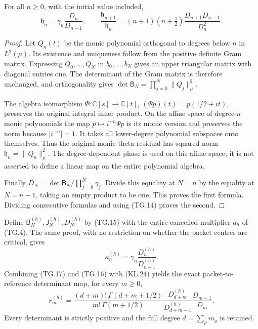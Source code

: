 \begin{theorem}
For all \(n\geq0\), with the initial value included,
\[
 \boxed{\mathfrak h_n=\gamma_n\frac{D_n}{D_{n-1}},\qquad
 \frac{\mathfrak h_{n+1}}{\mathfrak h_n}
   =(n+1)(n+\tfrac12)\frac{D_{n+1}D_{n-1}}{D_n^2}.}
                                                               \tag{TG.16}
\]
\end{theorem}
\begin{proof}
Let \(Q_n(t)\) be the monic polynomial orthogonal to degrees below
\(n\) in \(L^2(\mu)\).  Its existence and uniqueness follow
from the positive definite Gram matrix.  Expressing
\(Q_0,\ldots,Q_N\) in \(b_0,\ldots,b_N\) gives an upper
triangular matrix with diagonal entries one.  The determinant of
the Gram matrix is therefore unchanged, and orthogonality gives
\(\det\mathsf B_N=\prod_{j=0}^N\|Q_j\|_\mu^2\).

The algebra isomorphism
\(\Psi:\mathbb C[s]\to\mathbb C[t]\),
\((\Psi p)(t)=p(1/2+it)\), preserves the original integral
inner product.  On the affine space of degree-\(n\) monic
polynomials the map \(p\mapsto i^{-n}\Psi p\) is its monic
version and preserves the norm because \(|i^{-n}|=1\).
It takes all lower-degree polynomial subspaces onto themselves.
Thus the original monic theta residual has squared norm
\(\mathfrak h_n=\|Q_n\|_\mu^2\).  The degree-dependent phase
is used on this affine space; it is not asserted to define a linear
map on the entire polynomial algebra.

Finally \(D_N=\det\mathsf B_N/\prod_{j=0}^N\gamma_j\).
Divide this equality at \(N=n\) by the equality at \(N=n-1\),
taking an empty product to be one.  This proves the first formula.
Dividing consecutive formulas and using (TG.14) proves the second.
\end{proof}

Define \(\mathsf B_N^{(h)},\mathsf J_N^{(h)},D_N^{(h)}\)
by (TG.15) with the entire-cancelled multiplier \(a_h\) of
(TG.4).  The same proof, with no restriction on whether the packet
centres are critical, gives
\[
 \kappa_n^{(h)}=\gamma_n\frac{D_n^{(h)}}{D_{n-1}^{(h)}}.
                                                               \tag{TG.17}
\]
Combining (TG.17) and (TG.16) with (KL.24) yields the exact
packet-to-reference determinant map, for every \(m\geq0\),
\[
 \boxed{r_m^{(h)}=
  \frac{(d+m)!\,\Gamma(d+m+1/2)}{m!\,\Gamma(m+1/2)}
  \frac{D_{d+m}^{(h)}}{D_{d+m-1}^{(h)}}
  \frac{D_{m-1}}{D_m}.}
                                                               \tag{TG.18}
\]
Every determinant is strictly positive and the full degree
\(d=\sum_\rho m_\rho\) is retained.

